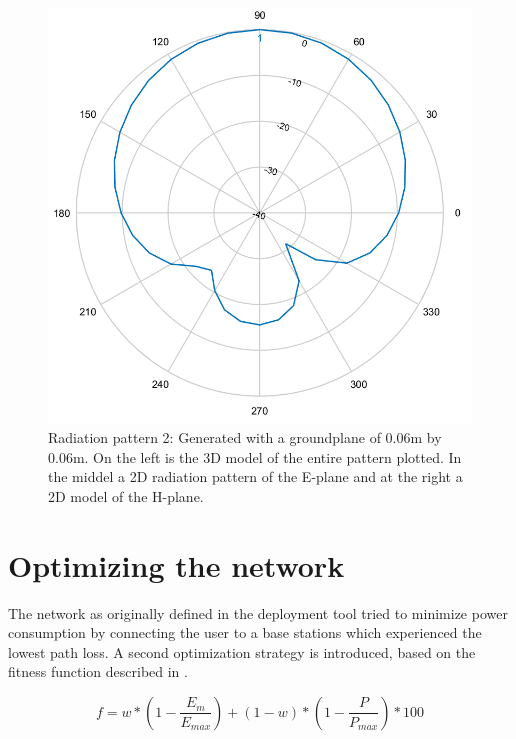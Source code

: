 \begin{figure}[!htb]
  \includegraphics[width=\linewidth]{../images/pattern1/hp.png}
\endminipage
  \caption{Radiation pattern 2: Generated with a groundplane of 0.06m by 0.06m. On the left is the 3D model of the entire pattern plotted. In the middel a 2D radiation pattern of the E-plane and at the right a 2D model of the H-plane.}
 \label{radpattern1}
\end{figure}

\section{Optimizing the network}
The network as originally defined in the deployment tool tried to minimize power consumption by connecting the user to a base stations which
experienced the lowest path loss. A second optimization strategy is introduced, based on the fitness function described in \cite{J1}.

\begin{equation} 
f = w * \left(1 - \frac{E_m}{E_{max}}\right) + (1 - w)*\left(1 - \frac{P}{P_{max}}\right) * 100
\label{eq:fitnessfunction}
\end{equation}

